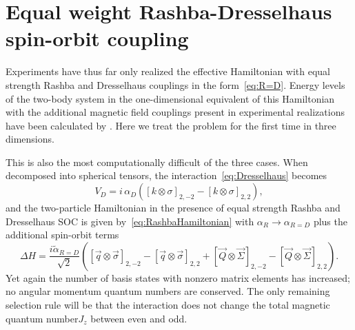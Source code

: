 \documentclass[%
 onecolumn,
 notitlepage,
 amsmath,amssymb,
 aps,
]{revtex4-1}
\begin{document}
\section{\label{sec:R=D} Equal weight Rashba-Dresselhaus spin-orbit coupling}

Experiments have thus far only realized the effective Hamiltonian with equal strength Rashba and Dresselhaus couplings in the form~\eqref{eq:R=D}. Energy levels of the two-body system in the one-dimensional equivalent of this Hamiltonian with the additional magnetic field couplings present in experimental realizations have been calculated by \cite{guan2014energy}. Here we treat the problem for the first time in three dimensions.

This is also the most computationally difficult of the three cases. When decomposed into spherical tensors, the interaction~\eqref{eq:Dresselhaus} becomes
\begin{equation}
V_D=i\,\alpha_D \left( \left[ k \otimes \sigma \right]_{2,-2}- \left[ k \otimes \sigma \right]_{2,2}\right),
\end{equation}
and the two-particle Hamiltonian in the presence of equal strength Rashba and Dresselhaus SOC is given by~\eqref{eq:RashbaHamiltonian} with $\alpha_R\rightarrow \alpha_{R=D}$ plus the additional spin-orbit terms
\begin{equation}\label{eq:DresselhausHamiltonian}
\Delta H= \frac{i \tilde{\alpha}_{R=D}}{\sqrt{2}}\left(  \left[ \vec{q} \otimes \vec{\sigma} \right]_{2,-2} -  \left[ \vec{q} \otimes \vec{\sigma} \right]_{2,2} +[ \vec{Q} \otimes \vec{\Sigma} ]_{2,-2} -  [ \vec{Q} \otimes \vec{\Sigma} ]_{2,2} \right).
\end{equation} 
Yet again the number of basis states with nonzero matrix elements has increased; no angular momentum quantum numbers are conserved. The only remaining selection rule will be that the interaction does not change the total magnetic quantum number$J_z$ between even and odd. 
\end{document}

